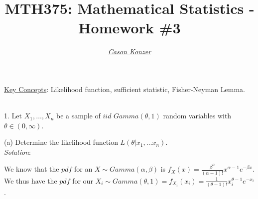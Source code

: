 \documentclass[12pt]{article}
\newcommand{\XB}{\color{black}}
\newcommand{\XBB}{\color{blue}}
\newcommand{\XV}{\color{violet}}
\begin{document}
\title{\textbf{MTH375}: Mathematical Statistics - Homework \#3}
\date{}
\author{\XV\textit{\large{\href{https://github.com/casonk}{Cason Konzer}}}\XB}

\maketitle
\hrulefill
\vfill 
    \underline{Key Concepts}: Likelihood function, sufficient statistic, Fisher-Neyman Lemma.

\newpage
\newpage
\XBB\hrulefill\XB \\

1. Let $ X_{1}, \dots , X_{n} $ be a sample of $ iid $ $ Gamma(\theta, 1) $ random variables with $ \theta \in (0, \infty) $. \\

\XBB\hrulefill\XB 
\vspace{5mm}


(a) Determine the likelihood function $ L(\theta | x_{1}, \dots x_{n}) $.
\vspace{2.5mm} \\
\textit{Solution}:
\vspace{2.5mm}

\noindent
We know that the $ pdf $ for an $ X \sim Gamma(\alpha, \beta) $ is $ \displaystyle f_{X}(x) = \frac{\beta^{\alpha}}{(\alpha - 1)!}x^{\alpha - 1}e^{-\beta x} $. \\

\noindent
We thus have the $ pdf $ for our $ \displaystyle X_{i} \sim Gamma(\theta, 1) = f_{X_{i}}(x_{i}) = \frac{1}{(\theta - 1)!}x_{i}^{\theta - 1}e^{-x_{i}} $. \\
\end{document}
